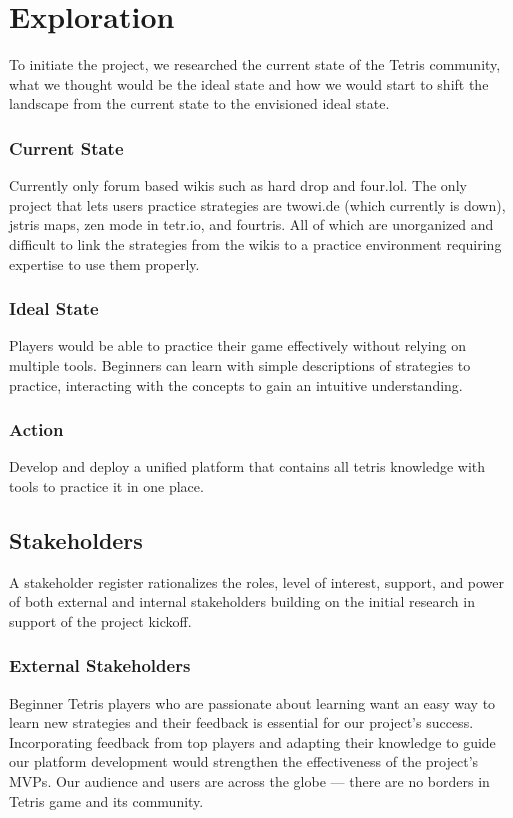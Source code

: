 \documentclass[english,course]{lecture}
\begin{document}
\section{Exploration}
To initiate the project, we researched the current state of the Tetris community, what we thought would be the ideal state and how we would start to shift the landscape from the current state to the envisioned ideal state.
%
\subsubsection*{Current State}
Currently only forum based wikis such as hard drop and four.lol. The only project that lets users practice strategies are twowi.de (which currently is down), jstris maps, zen mode in tetr.io, and fourtris. All of which are unorganized and difficult to link the strategies from the wikis to a practice environment requiring expertise to use them properly.
%
\subsubsection*{Ideal State}
Players would be able to practice their game effectively without relying on multiple tools. Beginners can learn with simple descriptions of strategies to practice, interacting with the concepts to gain an intuitive understanding.
%
\subsubsection*{Action}
Develop and deploy a unified platform that contains all tetris knowledge with tools to practice it in one place.
%
\subsection{Stakeholders}
A stakeholder register rationalizes the roles, level of interest, support, and power of both external and internal stakeholders building on the initial research in support of the project kickoff.
%
\subsubsection*{External Stakeholders}
Beginner Tetris players who are passionate about learning want an easy way to learn new strategies and their feedback is essential for our project's success. Incorporating feedback from top players and adapting their knowledge to guide our platform development would strengthen the effectiveness of the project's MVPs. Our audience and users are across the globe --- there are no borders in Tetris game and its community.
%
\end{document}
